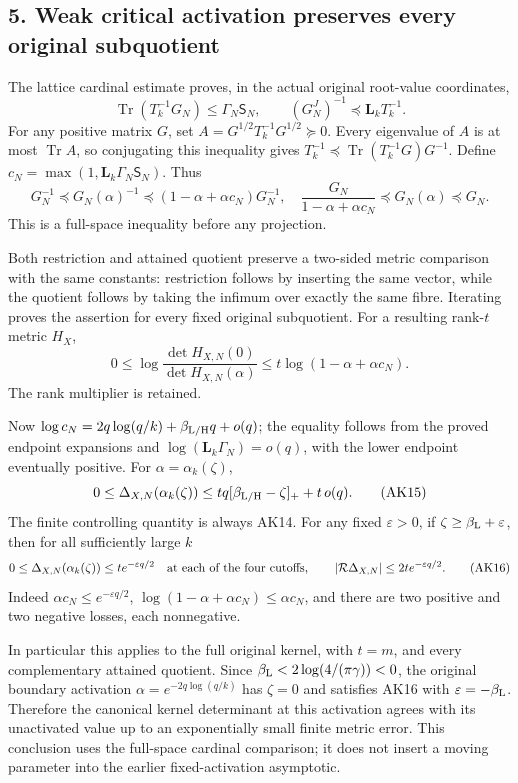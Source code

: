 \subsection{5. Weak critical activation preserves every original subquotient}\label{weak-critical-activation-preserves-every-original-subquotient}

The lattice cardinal estimate proves, in the actual original root-value coordinates, \[
\operatorname{Tr}(T_k^{-1}G_N)\le\Gamma_N\mathsf S_N,\qquad
(G_N^J)^{-1}\preceq\mathbf L_kT_k^{-1}.
\] For any positive matrix \(G\), set \(A=G^{1/2}T_k^{-1}G^{1/2}\succeq0\). Every eigenvalue of \(A\) is at most \(\operatorname{Tr}A\), so conjugating this inequality gives \(T_k^{-1}\preceq\operatorname{Tr}(T_k^{-1}G)G^{-1}\). Define \(c_N=\max(1,\mathbf L_k\Gamma_N\mathsf S_N)\). Thus \[
G_N^{-1}\preceq G_N(\alpha)^{-1}
 \preceq(1-\alpha+\alpha c_N)G_N^{-1},
\quad
\frac{G_N}{1-\alpha+\alpha c_N}
 \preceq G_N(\alpha)\preceq G_N.
\tag{AK13}
\] This is a full-space inequality before any projection.

Both restriction and attained quotient preserve a two-sided metric comparison with the same constants: restriction follows by inserting the same vector, while the quotient follows by taking the infimum over exactly the same fibre. Iterating proves the assertion for every fixed original subquotient. For a resulting rank-\(t\) metric \(H_X\), \[
0\le\log\frac{\det H_{X,N}(0)}{\det H_{X,N}(\alpha)}
\le t\log(1-\alpha+\alpha c_N).
\tag{AK14}
\] The rank multiplier is retained.

Now \(\log c_N=2q\log(q/k)+\beta_{\rm L/H}q+o(q)\); the equality follows from the proved endpoint expansions and \(\log(\mathbf L_k\Gamma_N)=o(q)\), with the lower endpoint eventually positive. For \(\alpha=\alpha_k(\zeta)\), \[
0\le\Delta_{X,N}(\alpha_k(\zeta))
\le tq[\beta_{\rm L/H}-\zeta]_++t\,o(q).
\tag{AK15}
\] The finite controlling quantity is always AK14. For any fixed \(\varepsilon>0\), if \(\zeta\ge\beta_{\rm L}+\varepsilon\), then for all sufficiently large \(k\) \[
0\le\Delta_{X,N}(\alpha_k(\zeta))\le t e^{-\varepsilon q/2}
\quad\hbox{at each of the four cutoffs},\qquad
|\mathcal R\Delta_{X,N}|\le2t e^{-\varepsilon q/2}.
\tag{AK16}
\] Indeed \(\alpha c_N\le e^{-\varepsilon q/2}\), \(\log(1-\alpha+\alpha c_N)\le\alpha c_N\), and there are two positive and two negative losses, each nonnegative.

In particular this applies to the full original kernel, with \(t=m\), and every complementary attained quotient. Since \(\beta_{\rm L}<2\log(4/(\pi\gamma))<0\), the original boundary activation \(\alpha=e^{-2q\log(q/k)}\) has \(\zeta=0\) and satisfies AK16 with \(\varepsilon=-\beta_{\rm L}\). Therefore the canonical kernel determinant at this activation agrees with its unactivated value up to an exponentially small finite metric error. This conclusion uses the full-space cardinal comparison; it does not insert a moving parameter into the earlier fixed-activation asymptotic.


